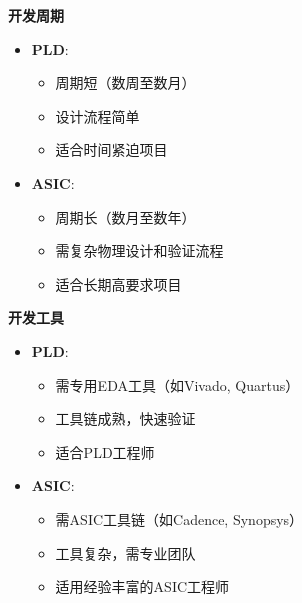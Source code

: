 \documentclass{beamer}
\providecommand{\tightlist}{%
  \setlength{\itemsep}{0pt}\setlength{\parskip}{0pt}}
\begin{document}
\begin{frame}{\textbf{开发周期}}

\begin{itemize}
\tightlist
\item
    \textbf{PLD}:

    \begin{itemize}
    \tightlist
    \item
    周期短（数周至数月）\\
    \item
    设计流程简单\\
    \item
    适合时间紧迫项目\\
    \end{itemize}
\item
    \textbf{ASIC}:

    \begin{itemize}
    \tightlist
    \item
    周期长（数月至数年）\\
    \item
    需复杂物理设计和验证流程\\
    \item
    适合长期高要求项目
    \end{itemize}
\end{itemize}
\end{frame}

\begin{frame}{\textbf{开发工具}}

\begin{itemize}
\tightlist
\item
    \textbf{PLD}:

    \begin{itemize}
    \tightlist
    \item
    需专用EDA工具（如Vivado, Quartus）\\
    \item
    工具链成熟，快速验证\\
    \item
    适合PLD工程师\\
    \end{itemize}
\item
    \textbf{ASIC}:

    \begin{itemize}
    \tightlist
    \item
    需ASIC工具链（如Cadence, Synopsys）\\
    \item
    工具复杂，需专业团队\\
    \item
    适用经验丰富的ASIC工程师
    \end{itemize}
\end{itemize}
\end{frame}
\end{document}
